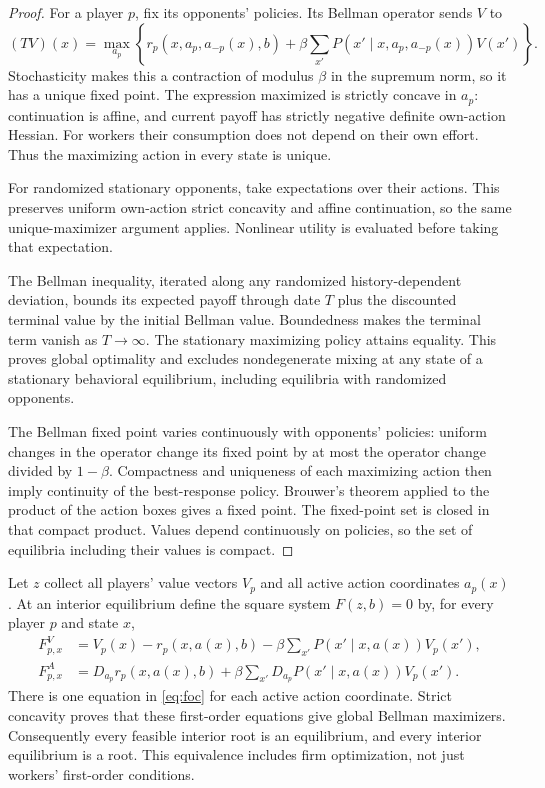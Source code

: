 \documentclass[11pt]{article}
\begin{document}
\begin{proof}
For a player $p$, fix its opponents' policies. Its Bellman operator sends $V$ to
\[
 (TV)(x)=\max_{a_p}\left\{r_p(x,a_p,a_{-p}(x),b)
        +\beta\sum_{x'}P(x'\mid x,a_p,a_{-p}(x))V(x')\right\}.
\]
Stochasticity makes this a contraction of modulus $\beta$ in the supremum norm, so it has a unique fixed point. The expression maximized is strictly concave in $a_p$: continuation is affine, and current payoff has strictly negative definite own-action Hessian. For workers their consumption does not depend on their own effort. Thus the maximizing action in every state is unique.

For randomized stationary opponents, take expectations over their actions. This preserves uniform own-action strict concavity and affine continuation, so the same unique-maximizer argument applies. Nonlinear utility is evaluated before taking that expectation.

The Bellman inequality, iterated along any randomized history-dependent deviation, bounds its expected payoff through date $T$ plus the discounted terminal value by the initial Bellman value. Boundedness makes the terminal term vanish as $T\to\infty$. The stationary maximizing policy attains equality. This proves global optimality and excludes nondegenerate mixing at any state of a stationary behavioral equilibrium, including equilibria with randomized opponents.

The Bellman fixed point varies continuously with opponents' policies: uniform changes in the operator change its fixed point by at most the operator change divided by $1-\beta$. Compactness and uniqueness of each maximizing action then imply continuity of the best-response policy. Brouwer's theorem \cite{brouwer} applied to the product of the action boxes gives a fixed point. The fixed-point set is closed in that compact product. Values depend continuously on policies, so the set of equilibria including their values is compact.
\end{proof}

Let $z$ collect all players' value vectors $V_p$ and all active action coordinates $a_p(x)$. At an interior equilibrium define the square system $F(z,b)=0$ by, for every player $p$ and state $x$,
\begin{align}
 F^V_{p,x}&=V_p(x)-r_p(x,a(x),b)
              -\beta\sum_{x'}P(x'\mid x,a(x))V_p(x'),\label{eq:bellman}\\
 F^A_{p,x}&=D_{a_p}r_p(x,a(x),b)
              +\beta\sum_{x'}D_{a_p}P(x'\mid x,a(x))V_p(x').\label{eq:foc}
\end{align}
There is one equation in \eqref{eq:foc} for each active action coordinate. Strict concavity proves that these first-order equations give global Bellman maximizers. Consequently every feasible interior root is an equilibrium, and every interior equilibrium is a root. This equivalence includes firm optimization, not just workers' first-order conditions.
\end{document}
